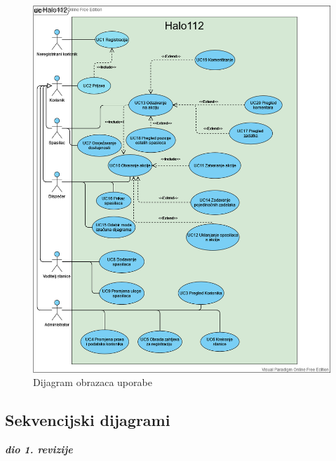 				\begin{figure}[H]
					\includegraphics[scale=0.5]{slike/usecase.PNG}
					\centering
					\caption{Dijagram obrazaca uporabe}
					\label{fig:obrasci_uporabe}
				\end{figure}
				\eject		
				
			\subsection{Sekvencijski dijagrami}
				
				\textbf{\textit{dio 1. revizije}}\\
				
